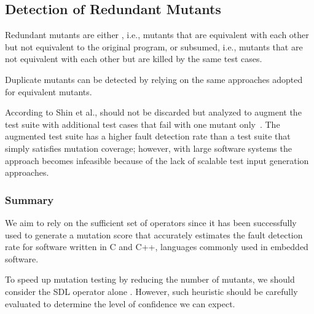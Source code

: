 
\subsection{Detection of Redundant Mutants}
\label{sec:background:redundant}
Redundant mutants are either , i.e., mutants that are equivalent with each other but not equivalent to the original program, or subsumed, i.e., mutants that are not equivalent with each other but are killed by the same test cases.

Duplicate mutants can be detected by relying on the same approaches adopted for equivalent mutants.

According to Shin et al.,  should not be discarded but analyzed to augment the test suite with additional test cases that fail with one mutant only~\cite{Shin:TSE:DCriterion:2018}.
The augmented test suite has a higher
 fault detection rate than a test suite that simply satisfies mutation coverage; however, with large software systems the approach becomes infeasible because of the lack of scalable test input generation approaches.



\subsubsection{Summary}
\label{sec:back:summary}

We aim to rely on the sufficient set of operators since it has been successfully used to generate a mutation score that accurately estimates the fault detection rate for software written in C and C++, languages commonly used in embedded software.

To speed up mutation testing by reducing the number of mutants, we should consider the SDL operator alone . However, such heuristic should be carefully evaluated to determine the level of confidence we can expect.

